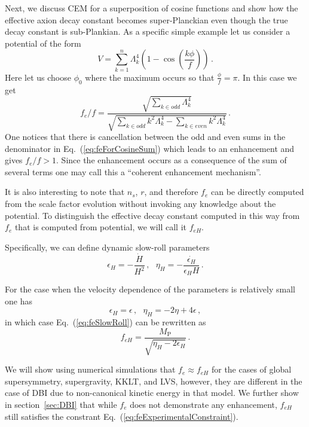 \documentclass[12pt]{article}
\begin{document}
Next, we discuss CEM for a superposition of cosine functions and show how the effective axion decay constant becomes super-Planckian even though the true decay constant is sub-Plankian.
As a specific simple example let us consider a potential of the form
\begin{equation} \label{eq:cosineSumPotential}
  V = \sum_{k = 1}^n \Lambda_k^4 \left(1 - \cos\left(\frac{k\phi}{f}\right)\right)\,.
\end{equation}
Here let us choose $\phi_0$ where the maximum occurs so that $\frac{\phi}{f} = \pi$.
In this case we get
\begin{equation} \label{eq:feForCosineSum}
  {f_e} / f = \frac
    {\sqrt{\sum_{k \in odd} \Lambda_k^4}}
    {\sqrt{\sum_{k \in odd} k^2 \Lambda_k^4 - \sum_{k \in even} k^2 \Lambda_k^4}}\,.
\end{equation}
One notices that there is cancellation between the odd and even sums in the denominator in Eq.~(\ref{eq:feForCosineSum}) which leads to an enhancement and gives $f_e / f > 1$.
Since the enhancement occurs as a consequence of the sum of several terms one may call this a ``coherent enhancement mechanism''.

It is also interesting to note that $n_s$, $r$, and therefore $f_e$ can be directly computed from the scale factor evolution without invoking any knowledge about the potential.
To distinguish the effective decay constant computed in this way from $f_e$ that is computed from potential, we will call it $f_{eH}$.

Specifically, we can define dynamic slow-roll parameters
\begin{equation} \label{eq:slowRollParametersDynamic}
  \epsilon_H = -\frac{\dot H}{H^2}\,,
  ~~~ \eta_H = -\frac{\dot{\epsilon_H}}{\epsilon_H H}\,.
\end{equation}

For the case when the velocity dependence of the parameters is relatively small one has
\begin{equation} \label{eq:slowRollParametersDynamicFromStatic}
  \epsilon_H = \epsilon\,,
  ~~~ \eta_H = -2 \eta + 4 \epsilon\,,
\end{equation}
in which case Eq.~(\ref{eq:feSlowRoll}) can be rewritten as
\begin{equation} \label{eq:feFromDynamicSlowRollParameters}
  f_{eH} = \frac{M_\text{P}}{\sqrt{\eta_H - 2 \epsilon_H}}\,.
\end{equation}

We will show using numerical simulations that $f_e \approx f_{eH}$ for the cases of global supersymmetry, supergravity, KKLT, and LVS, however, they are different in the case of DBI due to non-canonical kinetic energy in that model.
We further show in section~\ref{sec:DBI} that while $f_e$ does not demonstrate any enhancement, $f_{eH}$ still satisfies the constrant Eq.~(\ref{eq:feExperimentalConstraint}).
\end{document}

